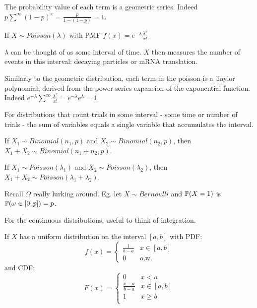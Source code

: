 \documentclass[10pt]{article}
\begin{document}
The probability value of each term is a geometric series. Indeed $p
\sum^{\infty}(1-p)^x = \frac{p}{1-(1-p)} = 1$.

\begin{definition}
    If $X \sim Poisson(\lambda)$ with PMF $f(x) = e^{-\lambda}\frac{\lambda^x}{x!}$
\end{definition}

$\lambda$ can be thought of as some interval of time. $X$ then measures the
number of events in this interval: decaying particles or mRNA translation.

Similarly to the geometric distribution, each term in the poisson is a Taylor
polynomial, derived from the power series expansion of the exponential
function. Indeed $e^{-\lambda}\sum^{\infty}\frac{\lambda^x}{x!} = e^{-\lambda}e^{\lambda}
= 1$. 

\begin{note}
    For distributions that count trials in some interval - some time or
    number of trials - the sum of variables equals a single variable that
    accumulates the interval. 

    If $X_1 \sim Binomial(n_1, p)$ and $X_2 \sim Binomial(n_2, p)$, then $X_1 +
    X_2 \sim Binomial(n_1 + n_2, p)$.

    If $X_1 \sim Poisson(\lambda_1)$ and $X_2 \sim Poisson(\lambda_2)$, then $X_1 +
    X_2 \sim Poisson(\lambda_1 + \lambda_2)$.
\end{note}

\begin{note}
    Recall $\Omega$ really lurking around. Eg. let $X \sim Bernoulli$ and $\P(X
    = 1)$ is $\P(\omega \in [0, p]) = p$. 
\end{note}

For the continuous distributions, useful to think of integration.

\begin{definition}
    If $X$ has a uniform distribution on the interval $[a, b]$ with PDF: \[f(x) = \begin{cases}
        \frac{1}{b-a} & x \in [a, b] \\
        0 & \text{o.w.}
        \end{cases}
    \]
    and CDF: \[F(x) = \begin{cases}
        0 & x < a \\
        \frac{x - a}{b - a} & x \in [a, b] \\
        1 & x \geq b \\
    \end{cases}
    \]
\end{definition}
\end{document}
